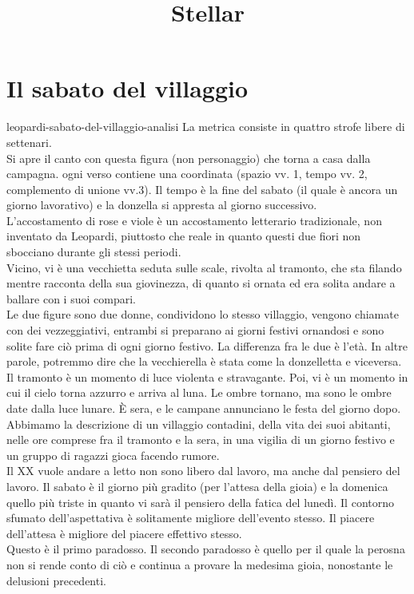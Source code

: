 \documentclass[preview]{standalone}
\begin{document}
\title{Stellar}
\genpage

\section{Il sabato del villaggio}

\begin{snippet}{leopardi-sabato-del-villaggio-analisi}
    La metrica consiste in quattro strofe libere di settenari.
    \\
    Si apre il canto con questa figura (non personaggio) che torna a casa dalla campagna.
    ogni verso contiene una coordinata (spazio vv. 1, tempo vv. 2, complemento di unione vv.3).
    Il tempo è la fine del sabato (il quale è ancora un giorno lavorativo)
    e la donzella si appresta al giorno successivo.
    \\
    L'accostamento di rose e viole è un accostamento letterario tradizionale,
    non inventato da Leopardi, piuttosto che reale in quanto
    questi due fiori non sbocciano durante gli stessi periodi.
    \\
    Vicino, vi è una vecchietta seduta sulle scale, rivolta al tramonto,
    che sta filando mentre racconta della sua giovinezza, di quanto si ornata
    ed era solita andare a ballare con i suoi compari.
    \\
    Le due figure sono due donne, condividono lo stesso villaggio,
    vengono chiamate con dei vezzeggiativi, entrambi si preparano ai giorni festivi ornandosi
    e sono solite fare ciò prima di ogni giorno festivo.
    La differenza fra le due è l'età.
    In altre parole, potremmo dire che la vecchierella è stata come la donzelletta
    e viceversa.
    \\
    Il tramonto è un momento di luce violenta e stravagante. Poi, vi è un momento in cui
    il cielo torna azzurro e arriva al luna. Le ombre tornano, ma sono le ombre date dalla
    luce lunare.
    È sera, e le campane annunciano le festa del giorno dopo.
    \\
    Abbimamo la descrizione di un villaggio contadini, della vita dei suoi abitanti,
    nelle ore comprese fra il tramonto e la sera, in una vigilia di un giorno festivo
    e un gruppo di ragazzi gioca facendo rumore.
    \\
    Il XX vuole andare a letto non sono libero dal lavoro, ma anche dal pensiero del lavoro.
    Il sabato è il giorno più gradito (per l'attesa della gioia) e la domenica quello più triste in quanto
    vi sarà il pensiero della fatica del lunedì.
    Il contorno sfumato dell'aspettativa è solitamente migliore dell'evento stesso.
    Il piacere dell'attesa è migliore del piacere effettivo stesso.
    \\
    Questo è il primo paradosso.
    Il secondo paradosso è quello per il quale la perosna non si rende conto di ciò
    e continua a provare la medesima gioia, nonostante le delusioni precedenti.
\end{snippet}
\end{document}
